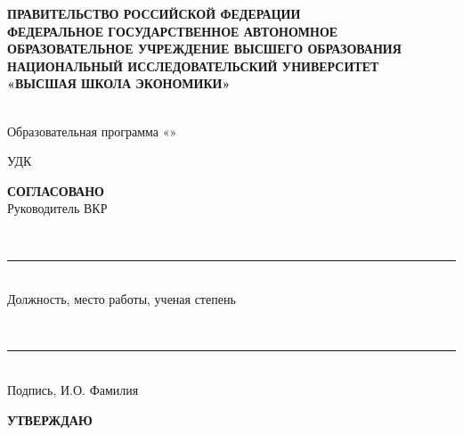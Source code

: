 %
\begin{titlepage}
\thispagestyle{empty}
\singlespacing
\footnotesize
\setlength{\parindent}{0pt}
\setlength{\parskip}{0pt}

\begin{center}
\textbf{ПРАВИТЕЛЬСТВО РОССИЙСКОЙ ФЕДЕРАЦИИ}\\
\textbf{ФЕДЕРАЛЬНОЕ ГОСУДАРСТВЕННОЕ АВТОНОМНОЕ}\\
\textbf{ОБРАЗОВАТЕЛЬНОЕ УЧРЕЖДЕНИЕ ВЫСШЕГО ОБРАЗОВАНИЯ}\\
\textbf{НАЦИОНАЛЬНЫЙ ИССЛЕДОВАТЕЛЬСКИЙ УНИВЕРСИТЕТ}\\
\textbf{«ВЫСШАЯ ШКОЛА ЭКОНОМИКИ»}

\vspace{0.35cm}
\hseFaculty\\
Образовательная программа «\hseSpecialization»
\end{center}

\vspace{0.25cm}
\noindent
УДК~\hseUDC

\vspace{0.4cm}
\noindent
\begin{minipage}[t]{0.46\textwidth}
\raggedright
\textbf{СОГЛАСОВАНО}\\
Руководитель ВКР

\vspace{0.15cm}
\strut\hseSupervisorTitle\\[-0.05cm]
\rule{6cm}{0.4pt}\\[-0.05cm]
{\scriptsize Должность, место работы, ученая степень}

\vspace{0.12cm}
\strut\hseSupervisorName\\[-0.05cm]
\rule{6cm}{0.4pt}\\[-0.05cm]
{\scriptsize Подпись, И.О. Фамилия}

\vspace{0.1cm}
\signdateblank
\end{minipage}
\hfill
\begin{minipage}[t]{0.46\textwidth}
\raggedright
\textbf{УТВЕРЖДАЮ}\\
\strut\hseAcademicSupervisorTitle


\end{minipage}
\end{titlepage}
